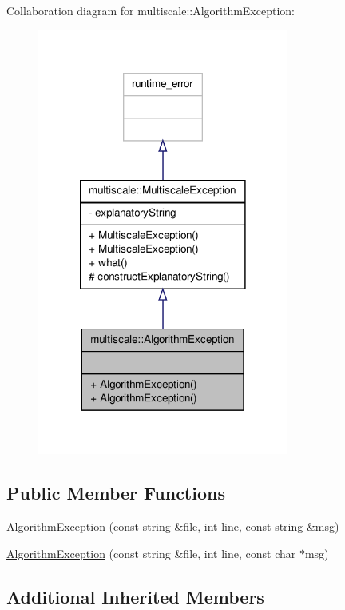 Collaboration diagram for multiscale\-:\-:Algorithm\-Exception\-:\nopagebreak
\begin{figure}[H]
\begin{center}
\leavevmode
\includegraphics[width=234pt]{classmultiscale_1_1AlgorithmException__coll__graph}
\end{center}
\end{figure}
\subsection*{Public Member Functions}
\begin{DoxyCompactItemize}
\item 
\hyperlink{classmultiscale_1_1AlgorithmException_a82b64c1819436f13d85f1749c6f0a9a4}{Algorithm\-Exception} (const string \&file, int line, const string \&msg)
\item 
\hyperlink{classmultiscale_1_1AlgorithmException_a8e93ad9821b69a6b4ac459f76b3a82ee}{Algorithm\-Exception} (const string \&file, int line, const char $\ast$msg)
\end{DoxyCompactItemize}
\subsection*{Additional Inherited Members}


